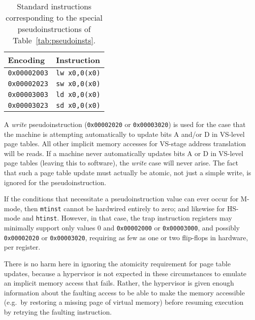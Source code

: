 \begin{table*}[h!]
\begin{center}
\begin{tabular}{|l|l|}
\hline
Encoding         & Instruction \\ \hline
{\tt 0x00002003} & {\tt lw x0,0(x0)} \\
{\tt 0x00002023} & {\tt sw x0,0(x0)} \\ \hline
{\tt 0x00003003} & {\tt ld x0,0(x0)} \\
{\tt 0x00003023} & {\tt sd x0,0(x0)} \\ \hline
\end{tabular}
\end{center}
\caption{Standard instructions corresponding to the special
pseudoinstructions of Table~\ref{tab:pseudoinsts}.}
\label{tab:pseudoinsts-basis}
\end{table*}

A \textit{write} pseudoinstruction ({\tt 0x00002020} or {\tt 0x00003020})
is used for the case that the machine is attempting automatically to
update bits A and/or D in VS-level page tables.
All other implicit memory accesses for VS-stage address translation will
be reads.
If a machine never automatically updates bits A or D in VS-level page
tables (leaving this to software), the \textit{write} case will never
arise.
The fact that such a page table update must actually be atomic, not just
a simple write, is ignored for the pseudoinstruction.

\begin{commentary}
If the conditions that necessitate a pseudoinstruction value can ever
occur for M-mode, then {\tt mtinst} cannot be hardwired entirely to zero;
and likewise for HS-mode and {\tt htinst}.
However, in that case, the trap instruction registers may minimally
support only values 0 and {\tt 0x00002000} or {\tt 0x00003000}, and
possibly {\tt 0x00002020} or {\tt 0x00003020}, requiring as few as one or
two flip-flops in hardware, per register.
\end{commentary}

\begin{commentary}
There is no harm here in ignoring the atomicity requirement for page
table updates, because a hypervisor is not expected in these
circumstances to emulate an implicit memory access that fails.
Rather, the hypervisor is given enough information about the faulting
access to be able to make the memory accessible (e.g.\ by restoring a
missing page of virtual memory) before resuming execution by retrying the
faulting instruction.
\end{commentary}

